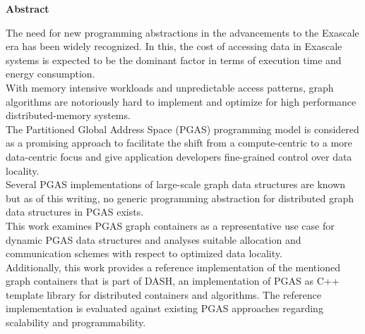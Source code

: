 \vspace*{2cm}

\begin{center}
    \textbf{Abstract}
\end{center}

\vspace*{1cm} 

\noindent The need for new programming abstractions in the advancements to the Exascale era has been widely recognized. In this, the cost of accessing data in Exascale systems is expected to be the dominant factor in terms of execution time and energy consumption.\\

\noindent With memory intensive workloads and unpredictable access patterns, graph algorithms are notoriously hard to implement and optimize for high performance distributed-memory systems.\\

\noindent The Partitioned Global Address Space (PGAS) programming model is considered as a promising approach to facilitate the shift from a compute-centric to a more data-centric focus and give application developers fine-grained control over data locality.\\

\noindent Several PGAS implementations of large-scale graph data structures are known but as of this writing, no generic programming abstraction for distributed graph data structures in PGAS exists.\\

\noindent This work examines PGAS graph containers as a representative use case for dynamic PGAS data structures and analyses suitable allocation and communication schemes with respect to optimized data locality.\\

\noindent Additionally, this work provides a reference implementation of the mentioned graph containers that is part of DASH, an implementation of PGAS as C++ template library for distributed containers and algorithms. The reference implementation is evaluated against existing PGAS approaches regarding scalability and programmability.